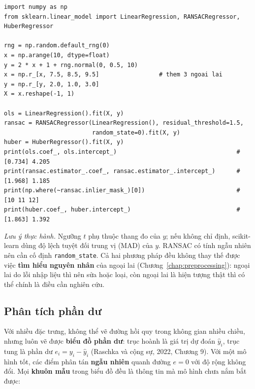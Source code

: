 \begin{lstlisting}[caption={OLS, RANSAC và Huber trên dữ liệu có ngoại lai}]
import numpy as np
from sklearn.linear_model import LinearRegression, RANSACRegressor, HuberRegressor

rng = np.random.default_rng(0)
x = np.arange(10, dtype=float)
y = 2 * x + 1 + rng.normal(0, 0.5, 10)
x = np.r_[x, 7.5, 8.5, 9.5]                 # them 3 ngoai lai
y = np.r_[y, 2.0, 1.0, 3.0]
X = x.reshape(-1, 1)

ols = LinearRegression().fit(X, y)
ransac = RANSACRegressor(LinearRegression(), residual_threshold=1.5,
                         random_state=0).fit(X, y)
huber = HuberRegressor().fit(X, y)
print(ols.coef_, ols.intercept_)                                  # [0.734] 4.205
print(ransac.estimator_.coef_, ransac.estimator_.intercept_)      # [1.968] 1.185
print(np.where(~ransac.inlier_mask_)[0])                          # [10 11 12]
print(huber.coef_, huber.intercept_)                              # [1.863] 1.392
\end{lstlisting}

\noindent\textit{Lưu ý thực hành.} Ngưỡng $t$ phụ thuộc thang đo của $y$; nếu không chỉ định, scikit-learn dùng độ lệch tuyệt đối trung vị (MAD) của $y$. RANSAC có tính ngẫu nhiên nên cần cố định \texttt{random\_state}. Cả hai phương pháp đều không thay thế được việc \textbf{tìm hiểu nguyên nhân} của ngoại lai (Chương~\ref{chap:preprocessing}): ngoại lai do lỗi nhập liệu thì nên sửa hoặc loại, còn ngoại lai là hiện tượng thật thì có thể chính là điều cần nghiên cứu.

\subsection{Phân tích phần dư}

Với nhiều đặc trưng, không thể vẽ đường hồi quy trong không gian nhiều chiều, nhưng luôn vẽ được \textbf{biểu đồ phần dư}: trục hoành là giá trị dự đoán $\hat{y}_i$, trục tung là phần dư $e_i = y_i - \hat{y}_i$ (Raschka và cộng sự, 2022, Chương 9). Với một mô hình tốt, các điểm phân tán \textbf{ngẫu nhiên} quanh đường $e = 0$ với độ rộng không đổi. Mọi \textbf{khuôn mẫu} trong biểu đồ đều là thông tin mà mô hình chưa nắm bắt được:

